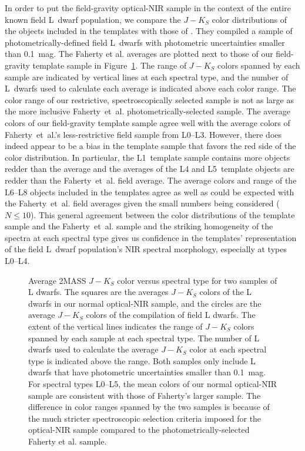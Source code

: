 \documentclass[modern,trackchanges]{aastex61}
\begin{document}
In order to put the field-gravity optical-NIR sample in the context of the entire known field L~dwarf population, we compare the $J-K_S$ color distributions of the objects included in the templates with those of \citet{Faherty13_0355}.
They compiled a sample of photometrically-defined field L~dwarfs with photometric uncertainties smaller than 0.1~mag.
The Faherty et al. averages are plotted next to those of our field-gravity template sample in Figure~\ref{fig:JK_colors_F13}.
The range of $J-K_S$ colors spanned by each sample are indicated by vertical lines at each spectral type, and the number of L~dwarfs used to calculate each average is indicated above each color range.
The color range of our restrictive, spectroscopically selected sample is not as large as the more inclusive Faherty~et~al. photometrically-selected sample.
The average colors of our field-gravity template sample agree well with the average colors of Faherty~et~al.'s less-restrictive field sample from L0--L3.
However, there does indeed appear to be a bias in the template sample that favors the red side of the color distribution.
In particular, the L1~template sample contains more objects redder than the average and the averages of the L4 and L5~template objects are redder than the Faherty~et~al. field average.
The average colors and range of the L6--L8 objects included in the templates agree as well as could be expected with the Faherty~et~al. field averages given the small numbers being considered ($N\le10$).
This general agreement between the color distributions of the template sample and the Faherty~et~al. sample and the striking homogeneity of the spectra at each spectral type gives us confidence in the templates' representation of the field L~dwarf population's NIR spectral morphology, especially at types L0--L4.

\begin{figure}
    \caption{Average 2MASS $J-K_S$ color versus spectral type for two samples of L dwarfs. The squares are the averages $J-K_S$ colors of the L dwarfs in our normal optical-NIR sample, and the circles are the average $J-K_S$ colors of the \citet{Faherty13_0355} compilation of field L dwarfs. The extent of the vertical lines indicates the range of $J-K_S$ colors spanned by each sample at each spectral type. The number of L dwarfs used to calculate the average $J-K_S$ color at each spectral type is indicated above the range. Both samples only include L dwarfs that have photometric uncertainties smaller than 0.1~mag. For spectral types L0--L5, the mean colors of our normal optical-NIR sample are consistent with those of Faherty's larger sample. The difference in color ranges spanned by the two samples is because of the much stricter spectroscopic selection criteria imposed for the optical-NIR sample compared to the photometrically-selected Faherty et al. sample.}
  \label{fig:JK_colors_F13}
\end{figure}
\end{document}
